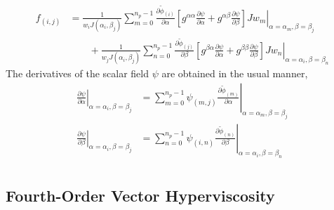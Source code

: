 \documentclass{article}
\newcommand{\pdiff}[2]{\frac{\partial #1}{\partial #2}}
\begin{document}
\begin{align}
f_{(i,j)} &= \frac{1}{w_i J(\alpha_i, \beta_j)} \sum_{m=0}^{n_p-1} \pdiff{\tilde{\phi}_{(i)}}{\alpha} \left. \left[ g^{\alpha \alpha} \pdiff{\psi}{\alpha} + g^{\alpha \beta} \pdiff{\psi}{\beta} \right] J w_m \right\vert_{\alpha = \alpha_m, \beta = \beta_j} \nonumber \\
& \qquad + \frac{1}{w_j J(\alpha_i, \beta_j)} \sum_{n=0}^{n_p-1} \pdiff{\tilde{\phi}_{(j)}}{\beta} \left. \left[ g^{\beta \alpha} \pdiff{\psi}{\alpha} + g^{\beta \beta} \pdiff{\psi}{\beta} \right] J w_n \right\vert_{\alpha = \alpha_i, \beta = \beta_n}
\end{align}  The derivatives of the scalar field $\psi$ are obtained in the usual manner,
\begin{align}
\left. \pdiff{\psi}{\alpha} \right\vert_{\alpha = \alpha_i, \beta = \beta_j} &= \sum_{m=0}^{n_p-1} \left. \psi_{(m,j)} \pdiff{\tilde{\phi}_{(m)}}{\alpha} \right\vert_{\alpha = \alpha_m, \beta = \beta_j} \\
\left. \pdiff{\psi}{\beta} \right\vert_{\alpha = \alpha_i, \beta = \beta_j} &= \sum_{n=0}^{n_p-1} \left. \psi_{(i,n)} \pdiff{\tilde{\phi}_{(n)}}{\beta} \right\vert_{\alpha = \alpha_i, \beta = \beta_n} \\
\end{align}


\subsection{Fourth-Order Vector Hyperviscosity}
\end{document}
